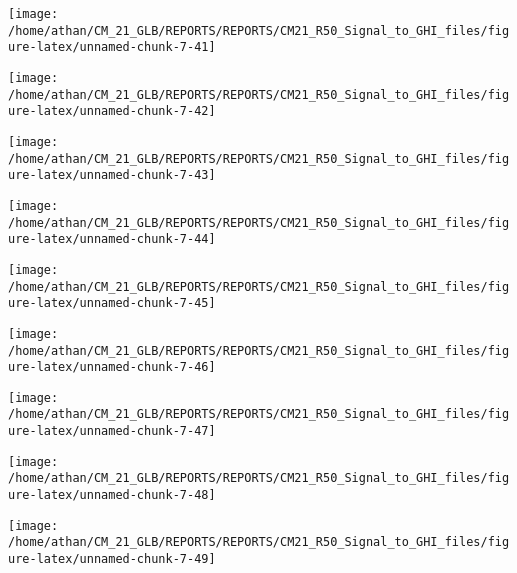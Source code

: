 \documentclass[
  11pt,
  a4paper,oneside]{article}
\begin{document}
\begin{center}\texttt{[image: /home/athan/CM\_21\_GLB/REPORTS/REPORTS/CM21\_R50\_Signal\_to\_GHI\_files/figure-latex/unnamed-chunk-7-41]} \end{center}

\begin{center}\texttt{[image: /home/athan/CM\_21\_GLB/REPORTS/REPORTS/CM21\_R50\_Signal\_to\_GHI\_files/figure-latex/unnamed-chunk-7-42]} \end{center}

\begin{center}\texttt{[image: /home/athan/CM\_21\_GLB/REPORTS/REPORTS/CM21\_R50\_Signal\_to\_GHI\_files/figure-latex/unnamed-chunk-7-43]} \end{center}

\begin{center}\texttt{[image: /home/athan/CM\_21\_GLB/REPORTS/REPORTS/CM21\_R50\_Signal\_to\_GHI\_files/figure-latex/unnamed-chunk-7-44]} \end{center}

\begin{center}\texttt{[image: /home/athan/CM\_21\_GLB/REPORTS/REPORTS/CM21\_R50\_Signal\_to\_GHI\_files/figure-latex/unnamed-chunk-7-45]} \end{center}

\begin{center}\texttt{[image: /home/athan/CM\_21\_GLB/REPORTS/REPORTS/CM21\_R50\_Signal\_to\_GHI\_files/figure-latex/unnamed-chunk-7-46]} \end{center}

\begin{center}\texttt{[image: /home/athan/CM\_21\_GLB/REPORTS/REPORTS/CM21\_R50\_Signal\_to\_GHI\_files/figure-latex/unnamed-chunk-7-47]} \end{center}

\begin{center}\texttt{[image: /home/athan/CM\_21\_GLB/REPORTS/REPORTS/CM21\_R50\_Signal\_to\_GHI\_files/figure-latex/unnamed-chunk-7-48]} \end{center}

\begin{center}\texttt{[image: /home/athan/CM\_21\_GLB/REPORTS/REPORTS/CM21\_R50\_Signal\_to\_GHI\_files/figure-latex/unnamed-chunk-7-49]} \end{center}

\FloatBarrier
\end{document}
